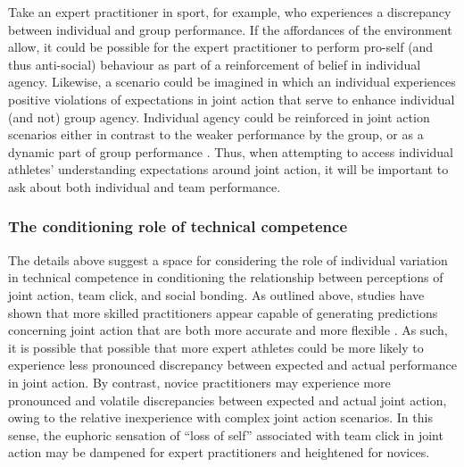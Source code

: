 \begin{mccorrection}
Take an expert practitioner in sport, for example, who experiences a discrepancy between individual and group performance. If the affordances of the environment allow, it could be possible for the expert practitioner to perform pro-self (and thus anti-social) behaviour as part of a reinforcement of belief in individual agency.  Likewise, a scenario could be imagined in which an individual experiences positive violations of expectations in joint action that serve to enhance individual (and not) group agency.  Individual agency could be reinforced in joint action scenarios either in contrast to the weaker performance by the group, or as a dynamic part of group performance \citep[in a similar sense to the theory of identity fusion, outlined above][]{Swann2009,Swann2015}. Thus, when attempting to access individual athletes' understanding expectations around joint action, it will be important to ask about both individual and team performance.
\end{mccorrection}


\begin{mccorrection}
\subsubsection{The conditioning role of technical competence}
The details above suggest a space for considering the role of individual variation in technical competence in conditioning the relationship between perceptions of joint action, team click, and social bonding.  As outlined above, studies have shown that more skilled practitioners appear capable of generating predictions concerning joint action that are both more accurate and more flexible \citep{Schmidt2011,Tomeo2012,Caron2017}.  As such, it is possible that possible that more expert athletes could be more likely to experience less pronounced discrepancy between expected and actual performance in joint action. By contrast, novice practitioners may experience more pronounced and volatile discrepancies between expected and actual joint action, owing to the relative inexperience with complex joint action scenarios.  In this sense, the euphoric sensation of ``loss of self'' associated with team click in joint action may be dampened for expert practitioners and heightened for novices.
\end{mccorrection}



\clearpage
